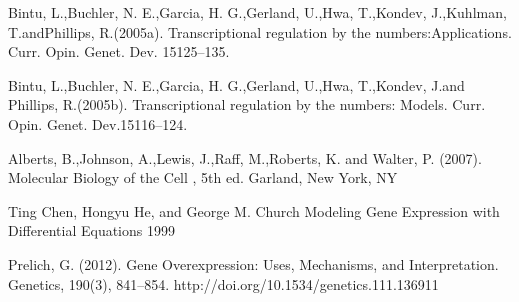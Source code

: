 
\begin{thebibliography}{00}

Bintu, L.,Buchler, N. E.,Garcia, H. G.,Gerland, U.,Hwa, T.,Kondev, J.,Kuhlman, T.andPhillips, R.(2005a). 
\newblock Transcriptional regulation by the numbers:Applications. 
\newblock Curr. Opin. Genet. Dev. 15125–135.

Bintu, L.,Buchler, N. E.,Garcia, H. G.,Gerland, U.,Hwa, T.,Kondev, J.and Phillips, R.(2005b). 
\newblock Transcriptional regulation by the numbers: Models.
\newblock Curr. Opin. Genet. Dev.15116–124.

Alberts, B.,Johnson, A.,Lewis, J.,Raff, M.,Roberts, K. and Walter, P. (2007).
\newblock Molecular Biology of the Cell
\newblock , 5th ed. Garland, New York, NY

Ting Chen, Hongyu He, and George M. Church
\newblock Modeling Gene Expression with Differential Equations 1999

Prelich, G. (2012). 
\newblock Gene Overexpression: Uses, Mechanisms, and Interpretation. 
\newblock Genetics, 190(3), 841–854. http://doi.org/10.1534/genetics.111.136911

\end{thebibliography}

